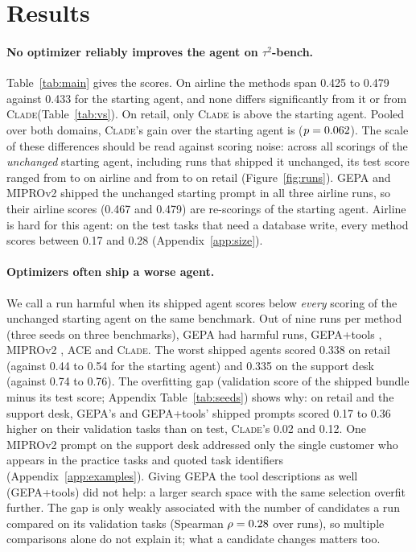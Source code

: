 \documentclass[11pt]{article}
\newcommand{\clade}{\textsc{Clade}\xspace}
\newcommand{\taub}{$\tau^2$-bench\xspace}
\begin{document}
\section{Results}
\label{sec:results}

\paragraph{No optimizer reliably improves the agent on \taub.} Table~\ref{tab:main} gives the scores. On airline the
methods span 0.425 to 0.479 against 0.433 for the starting agent, and none differs significantly from it or from
\clade (Table~\ref{tab:vs}). On retail, only \clade is above the starting agent. Pooled over both domains, \clade's
gain over the starting agent is \cladePooledGain{} ($p=0.062$). The scale of these differences should be
read against scoring noise: across all scorings of the \emph{unchanged} starting agent, including runs that shipped it
unchanged, its test score ranged from \startAirMin{} to \startAirMax{} on airline and from \startRetMin{} to
\startRetMax{} on retail (Figure~\ref{fig:runs}). GEPA and MIPROv2 shipped the unchanged starting prompt in all three
airline runs, so their airline scores (0.467 and 0.479) are re-scorings of the starting agent. Airline is hard for
this agent: on the \nWriteAir{} test tasks that need a database write, every method scores between 0.17 and 0.28
(Appendix~\ref{app:size}).

\paragraph{Optimizers often ship a worse agent.} We call a run harmful when its shipped agent scores below \emph{every}
scoring of the unchanged starting agent on the same benchmark. Out of nine runs per method (three seeds on three
benchmarks), GEPA had \harmGepa{} harmful runs, GEPA+tools \harmGepatools{}, MIPROv2 \harmMipro{}, ACE \harmAce{} and
\clade \harmClade{}. The worst shipped agents scored 0.338 on retail (against 0.44 to 0.54 for the starting agent)
and 0.335 on the support desk (against 0.74 to 0.76). The overfitting gap (validation score of the shipped bundle
minus its test score; Appendix Table~\ref{tab:seeds}) shows why: on retail and the support desk, GEPA's and
GEPA+tools' shipped prompts scored 0.17 to 0.36 higher on their validation tasks than on test, \clade's 0.02 and 0.12. One MIPROv2 prompt on the support desk
addressed only the single customer who appears in the practice tasks and quoted task identifiers
(Appendix~\ref{app:examples}). Giving GEPA the tool descriptions as well (GEPA+tools) did not help: a larger search
space with the same selection overfit further. The gap is only weakly associated with the number of candidates a
run compared on its validation tasks (Spearman $\rho=0.28$ over \candGapN{} runs), so multiple comparisons
alone do not explain it; what a candidate changes matters too.
\end{document}
